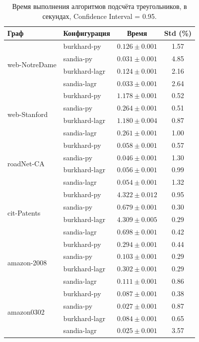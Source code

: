 \documentclass[a4paper]{article}
\begin{document}
\begin{table}[h!]
    \centering
    \small
    \caption{Время выполнения алгоритмов подсчёта треугольников, в секундах, Confidence Interval = 0.95.}
    \label{tab:benchmarks}
    \begin{tabular}{llcc}
        \toprule
        \textbf{Граф} & \textbf{Конфигурация} & \textbf{Время} & \textbf{Std (\%)} \\
        \midrule
        \multirow{4}{*}{web-NotreDame}
            & burkhard-py   & $0.126 \pm 0.001$ & 1.57 \\
            & sandia-py     & $0.031 \pm 0.001$ & 4.85 \\
            & burkhard-lagr & $0.124 \pm 0.001$ & 2.16 \\
            & sandia-lagr   & $0.033 \pm 0.001$ & 2.64 \\
        \midrule
        \multirow{4}{*}{web-Stanford}
            & burkhard-py   & $1.178 \pm 0.001$ & 0.52 \\
            & sandia-py     & $0.264 \pm 0.001$ & 0.51 \\
            & burkhard-lagr & $1.180 \pm 0.004$ & 0.87 \\
            & sandia-lagr   & $0.261 \pm 0.001$ & 1.00 \\
        \midrule
        \multirow{4}{*}{roadNet-CA}
            & burkhard-py   & $0.058 \pm 0.001$ & 0.57 \\
            & sandia-py     & $0.046 \pm 0.001$ & 1.30 \\
            & burkhard-lagr & $0.056 \pm 0.001$ & 0.99 \\
            & sandia-lagr   & $0.054 \pm 0.001$ & 1.32 \\
        \midrule
        \multirow{4}{*}{cit-Patents}
            & burkhard-py   & $4.322 \pm 0.012$ & 0.95 \\
            & sandia-py     & $0.679 \pm 0.001$ & 0.30 \\
            & burkhard-lagr & $4.309 \pm 0.005$ & 0.29 \\
            & sandia-lagr   & $0.698 \pm 0.001$ & 0.42 \\
        \midrule
        \multirow{4}{*}{amazon-2008}
            & burkhard-py   & $0.294 \pm 0.001$ & 0.44 \\
            & sandia-py     & $0.103 \pm 0.001$ & 0.29 \\
            & burkhard-lagr & $0.302 \pm 0.001$ & 0.29 \\
            & sandia-lagr   & $0.111 \pm 0.001$ & 0.86 \\
        \midrule
        \multirow{4}{*}{amazon0302}
            & burkhard-py   & $0.087 \pm 0.001$ & 0.38 \\
            & sandia-py     & $0.027 \pm 0.001$ & 0.87 \\
            & burkhard-lagr & $0.084 \pm 0.001$ & 0.65 \\
            & sandia-lagr   & $0.025 \pm 0.001$ & 3.57 \\
        \bottomrule
    \end{tabular}
\end{table}
\end{document}
